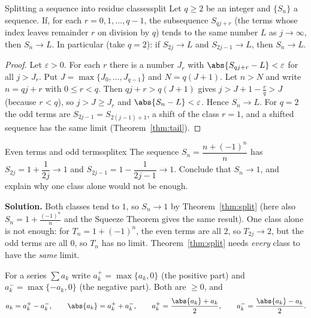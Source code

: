 \documentclass[11pt]{article}
\begin{document}
\begin{thm}{Splitting a sequence into residue classes}{split}
Let $q\ge2$ be an integer and $\{S_n\}$ a sequence. If, for each $r=0,1,\dots,q-1$, the subsequence $S_{qj+r}$ (the terms whose index leaves remainder $r$ on division by $q$) tends to the same number $L$ as $j\to\infty$, then $S_n\to L$. In particular (take $q=2$): if $S_{2j}\to L$ and $S_{2j-1}\to L$, then $S_n\to L$.
\end{thm}
\begin{proof}
Let $\varepsilon>0$. For each $r$ there is a number $J_r$ with $\abs{S_{qj+r}-L}<\varepsilon$ for all $j>J_r$. Put $J=\max\{J_0,\dots,J_{q-1}\}$ and $N=q(J+1)$. Let $n>N$ and write $n=qj+r$ with $0\le r<q$. Then $qj+r>q(J+1)$ gives $j>J+1-\frac rq>J$ (because $r<q$), so $j>J\ge J_r$ and $\abs{S_n-L}<\varepsilon$. Hence $S_n\to L$. For $q=2$ the odd terms are $S_{2j-1}=S_{2(j-1)+1}$, a shift of the class $r=1$, and a shifted sequence has the same limit (Theorem~\ref{thm:tail}).
\end{proof}

\begin{exmp}{Even terms and odd terms}{splitex}
The sequence $S_n=\dfrac{n+(-1)^n}{n}$ has $S_{2j}=1+\dfrac1{2j}\to1$ and $S_{2j-1}=1-\dfrac1{2j-1}\to1$. Conclude that $S_n\to1$, and explain why one class alone would not be enough.

\textbf{Solution.} Both classes tend to $1$, so $S_n\to1$ by Theorem~\ref{thm:split} (here also $S_n=1+\frac{(-1)^n}n$ and the Squeeze Theorem gives the same result). One class alone is not enough: for $T_n=1+(-1)^n$, the even terms are all $2$, so $T_{2j}\to2$, but the odd terms are all $0$, so $T_n$ has no limit. Theorem~\ref{thm:split} needs \emph{every} class to have the \emph{same} limit.
\end{exmp}

For a series $\sum a_k$ write $a_k^+=\max\{a_k,0\}$ (the positive part) and $a_k^-=\max\{-a_k,0\}$ (the negative part). Both are $\ge0$, and
\[
a_k=a_k^+-a_k^-,\qquad \abs{a_k}=a_k^++a_k^- ,\qquad a_k^+=\frac{\abs{a_k}+a_k}2,\qquad a_k^-=\frac{\abs{a_k}-a_k}2 .
\]
\end{document}

